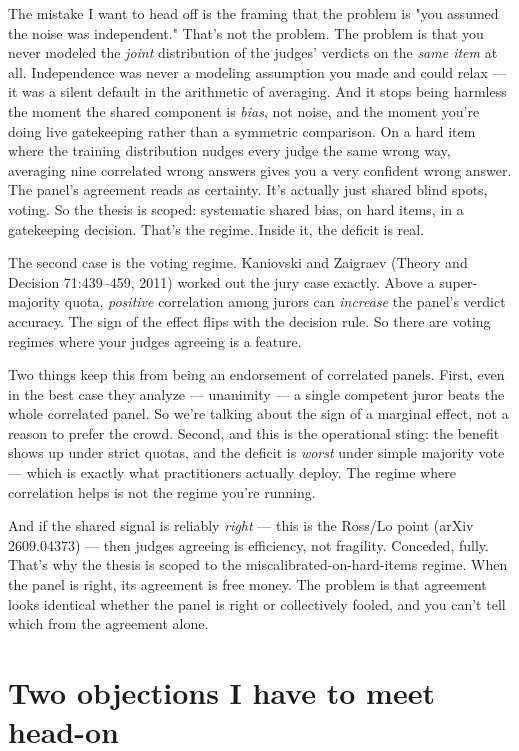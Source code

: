\documentclass[11pt]{article}
\begin{document}
The mistake I want to head off is the framing that the problem is "you assumed the noise was independent." That's not the problem. The problem is that you never modeled the \emph{joint} distribution of the judges' verdicts on the \emph{same item} at all. Independence was never a modeling assumption you made and could relax — it was a silent default in the arithmetic of averaging. And it stops being harmless the moment the shared component is \emph{bias}, not noise, and the moment you're doing live gatekeeping rather than a symmetric comparison. On a hard item where the training distribution nudges every judge the same wrong way, averaging nine correlated wrong answers gives you a very confident wrong answer. The panel's agreement reads as certainty. It's actually just shared blind spots, voting. So the thesis is scoped: systematic shared bias, on hard items, in a gatekeeping decision. That's the regime. Inside it, the deficit is real.

The second case is the voting regime. Kaniovski and Zaigraev (Theory and Decision 71:439–459, 2011) worked out the jury case exactly. Above a super-majority quota, \emph{positive} correlation among jurors can \emph{increase} the panel's verdict accuracy. The sign of the effect flips with the decision rule. So there are voting regimes where your judges agreeing is a feature.

Two things keep this from being an endorsement of correlated panels. First, even in the best case they analyze — unanimity — a single competent juror beats the whole correlated panel. So we're talking about the sign of a marginal effect, not a reason to prefer the crowd. Second, and this is the operational sting: the benefit shows up under strict quotas, and the deficit is \emph{worst} under simple majority vote — which is exactly what practitioners actually deploy. The regime where correlation helps is not the regime you're running.

And if the shared signal is reliably \emph{right} — this is the Ross/Lo point (arXiv 2609.04373) — then judges agreeing is efficiency, not fragility. Conceded, fully. That's why the thesis is scoped to the miscalibrated-on-hard-items regime. When the panel is right, its agreement is free money. The problem is that agreement looks identical whether the panel is right or collectively fooled, and you can't tell which from the agreement alone.

\section*{Two objections I have to meet head-on}
\end{document}
